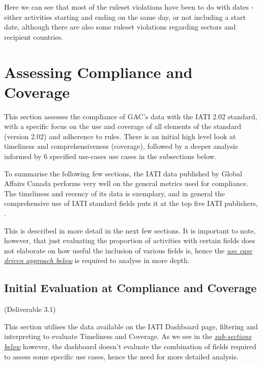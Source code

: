 \documentclass[letterpaper,10pt,english]{sphinxmanual}
\begin{document}
Here we can see that most of the ruleset violations have been to do with
dates - either activities starting and ending on the same day, or not
including a start date, although there are also some ruleset violations
regarding sectors and recipient countries.


\chapter{Assessing Compliance and Coverage}
\label{\detokenize{Global Affairs Canada - Compliance Report:Assessing-Compliance-and-Coverage}}
This section assesses the compliance of GAC’s data with the IATI 2.02
standard, with a specific focus on the use and coverage of all elements
of the standard (version 2.02) and adherence to rules. There is an
initial high level look at timeliness and comprehensiveness (coverage),
followed by a deeper analysis informed by 6 specified use-cases use
cases in the subsections below.

To summarise the following few sections, the IATI data published by
Global Affairs Canada performs very well on the general metrics used for
compliance. The timeliness and recency of its data is exemplary, and in
general the comprehensive use of IATI standard fields puts it at the top
five IATI publishers, .

This is described in more detail in the next few sections. It is
important to note, however, that just evaluating the proportion of
activities with certain fields does not elaborate on how useful the
inclusion of various fields is, hence the {\hyperref[\detokenize{Global Affairs Canada - Compliance Report:Detailed-Analysis-Method}]{\emph{use case driven approach
below}}} is required to analyse in more
depth.


\section{Initial Evaluation at Compliance and Coverage}
\label{\detokenize{Global Affairs Canada - Compliance Report:Initial-Evaluation-at-Compliance-and-Coverage}}
(Deliverable 3.1)

This section utilises the data available on the IATI Dashboard
page, filtering and interpreting to evaluate Timeliness and Coverage. As
we see in the {\hyperref[\detokenize{Global Affairs Canada - Compliance Report:Detailed-Analysis-Method}]{\emph{sub-sections below}}}
however, the dashboard doesn't evaluate the combination of fields
required to assess some specific use cases, hence the need for more
detailed analysis.
\end{document}
